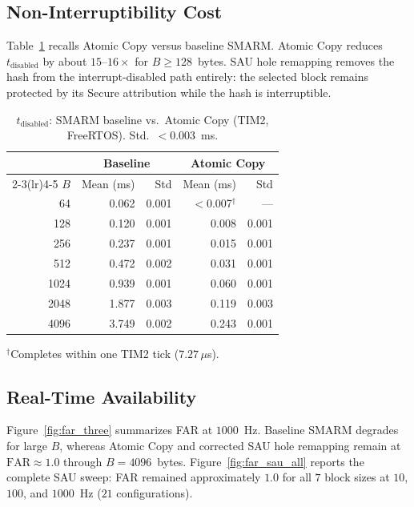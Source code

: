 \documentclass[conference]{IEEEtran}
\newcommand{\tdis}{$t_{\mathrm{disabled}}$\xspace}
\begin{document}
\subsection{Non-Interruptibility Cost}

Table~\ref{tab:tdisabled} recalls Atomic Copy versus baseline SMARM.
Atomic Copy reduces \tdis by about $15$--$16\times$ for
$B\geq 128$~bytes. SAU hole remapping removes the hash from the
interrupt-disabled path entirely: the selected block remains protected
by its Secure attribution while the hash is interruptible.

\begin{table}[!t]
  \centering
  \small
  \caption{$t_{\mathrm{disabled}}$: SMARM baseline vs.\ Atomic Copy
    (TIM2, FreeRTOS). Std.\ $<0.003$~ms.}
  \label{tab:tdisabled}
  \setlength{\tabcolsep}{3.5pt}
  \begin{tabular}{rrrrr}
    \toprule
    & \multicolumn{2}{c}{\textbf{Baseline}}
    & \multicolumn{2}{c}{\textbf{Atomic Copy}} \\
    \cmidrule(lr){2-3}\cmidrule(lr){4-5}
    \textbf{$B$} & Mean (ms) & Std & Mean (ms) & Std \\
    \midrule
    64   & 0.062 & 0.001 & $<$0.007$^\dagger$ & --- \\
    128  & 0.120 & 0.001 & 0.008 & 0.001 \\
    256  & 0.237 & 0.001 & 0.015 & 0.001 \\
    512  & 0.472 & 0.002 & 0.031 & 0.001 \\
    1024 & 0.939 & 0.001 & 0.060 & 0.001 \\
    2048 & 1.877 & 0.003 & 0.119 & 0.003 \\
    4096 & 3.749 & 0.002 & 0.243 & 0.001 \\
    \bottomrule
  \end{tabular}

  \smallskip
  \raggedright\footnotesize
  $^\dagger$Completes within one TIM2 tick ($7.27\,\mu$s).
\end{table}

\subsection{Real-Time Availability}

Figure~\ref{fig:far_three} summarizes FAR at $1000$~Hz. Baseline SMARM
degrades for large $B$, whereas Atomic Copy and corrected SAU hole
remapping remain at $\mathrm{FAR}\approx 1.0$ through
$B{=}4096$~bytes. Figure~\ref{fig:far_sau_all} reports the complete SAU
sweep: FAR remained approximately $1.0$ for all $7$ block sizes at
$10$, $100$, and $1000$~Hz ($21$ configurations).
\end{document}
